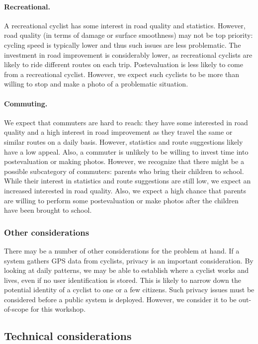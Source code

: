 \documentclass[a4paper,11pt]{article}
\begin{document}
\paragraph{Recreational.}
A recreational cyclist has some interest in road quality and statistics. However, road quality (in terms of damage or surface smoothness) may not be top priority: cycling speed is typically lower and thus such issues are less problematic. The investment in road improvement is considerably lower, as recreational cyclists are likely to ride different routes on each trip. Postevaluation is less likely to come from a recreational cyclist. However, we expect such cyclists to be more than willing to stop and make a photo of a problematic situation.

\paragraph{Commuting.}
We expect that commuters are hard to reach: they have some interested in road quality and a high interest in road improvement as they travel the same or similar routes on a daily basis. However, statistics and route suggestions likely have a low appeal. Also, a commuter is unlikely to be willing to invest time into postevaluation or making photos.
However, we recognize that there might be a possible subcategory of commuters: parents who bring their children to school. While their interest in statistics and route suggestions are still low, we expect an increased interested in road quality. Also, we expect a high chance that parents are willing to perform some postevaluation or make photos after the children have been brought to school.

\subsubsection{Other considerations}

There may be a number of other considerations for the problem at hand. If a system gathers GPS data from cyclists, privacy is an important consideration. By looking at daily patterns, we may be able to establish where a cyclist works and lives, even if no user identification is stored. This is likely to narrow down the potential identity of a cyclist to one or a few citizens. Such privacy issues must be considered before a public system is deployed. However, we consider it to be out-of-scope for this workshop.

\subsection{Technical considerations}
\end{document}
